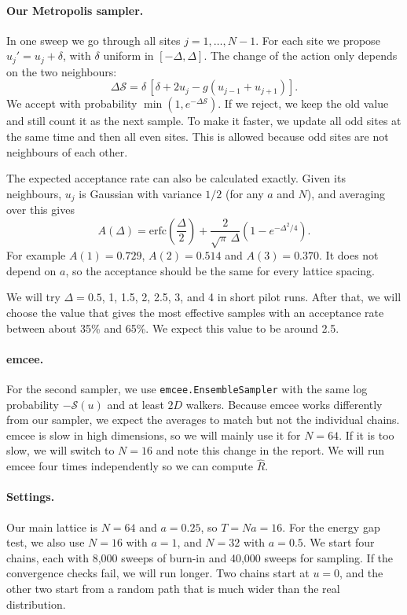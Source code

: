 \documentclass[11pt]{article}
\begin{document}
\paragraph{Our Metropolis sampler.} In one sweep we go through all sites $j = 1, \dots, N-1$. For each site we propose $u_j' = u_j + \delta$, with $\delta$ uniform in $[-\Delta, \Delta]$. The change of the action only depends on the two neighbours:
\begin{equation}
  \Delta\mathcal S = \delta\,[\delta + 2u_j - g(u_{j-1}+u_{j+1})].
  \label{eq:dS}
\end{equation}
We accept with probability $\min(1, e^{-\Delta \mathcal S})$. If we reject, we keep the old value and still count it as the next sample. To make it faster, we update all odd sites at the same time and then all even sites. This is allowed because odd sites are not neighbours of each other.

The expected acceptance rate can also be calculated exactly. Given its neighbours, $u_j$ is Gaussian with variance $1/2$ (for any $a$ and $N$), and averaging over this gives
\begin{equation}
  A(\Delta) = \mathrm{erfc}\!\left(\frac\Delta 2\right) + \frac{2}{\sqrt\pi\,\Delta}\left(1 - e^{-\Delta^2/4}\right).
  \label{eq:acc}
\end{equation}
For example $A(1) = 0.729$, $A(2) = 0.514$ and $A(3) = 0.370$. It does not depend on $a$, so the acceptance should be the same for every lattice spacing.

We will try $\Delta = 0.5$, 1, 1.5, 2, 2.5, 3, and 4 in short pilot runs. After that, we will choose the value that gives the most effective samples with an acceptance rate between about 35\% and 65\%. We expect this value to be around 2.5.

\paragraph{emcee.} For the second sampler, we use \texttt{emcee.EnsembleSampler} with the same log probability $-\mathcal S(u)$ and at least $2D$ walkers. Because emcee works differently from our sampler, we expect the averages to match but not the individual chains. emcee is slow in high dimensions, so we will mainly use it for $N = 64$. If it is too slow, we will switch to $N = 16$ and note this change in the report. We will run emcee four times independently so we can compute $\hat R$.

\paragraph{Settings.} Our main lattice is $N = 64$ and $a = 0.25$, so $T = Na = 16$. For the energy gap test, we also use $N = 16$ with $a = 1$, and $N = 32$ with $a = 0.5$. We start four chains, each with 8,000 sweeps of burn-in and 40,000 sweeps for sampling. If the convergence checks fail, we will run longer. Two chains start at $u = 0$, and the other two start from a random path that is much wider than the real distribution.
\end{document}
